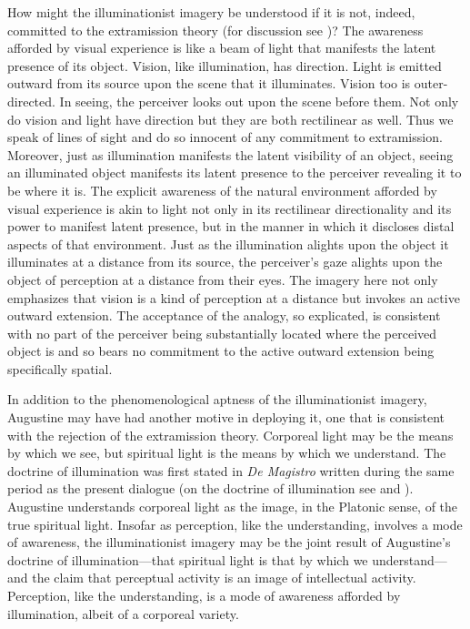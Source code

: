 \documentclass[12pt]{article}
\begin{document}
How might the illuminationist imagery be understood if it is not, indeed, committed to the extramission theory (for discussion see \citealt[chapter 5]{Kalderon:2018oe})? The awareness afforded by visual experience is like a beam of light that manifests the latent presence of its object. Vision, like illumination, has direction. Light is emitted outward from its source upon the scene that it illuminates. Vision too is outer-directed. In seeing, the perceiver looks out upon the scene before them. Not only do vision and light have direction but they are both rectilinear as well. Thus we speak of lines of sight and do so innocent of any commitment to extramission. Moreover, just as illumination manifests the latent visibility of an object, seeing an illuminated object manifests its latent presence to the perceiver revealing it to be where it is. The explicit awareness of the natural environment afforded by visual experience is akin to light not only in its rectilinear directionality and its power to manifest latent presence, but in the manner in which it discloses distal aspects of that environment. Just as the illumination alights upon the object it illuminates at a distance from its source, the perceiver’s gaze alights upon the object of perception at a distance from their eyes. The imagery here not only emphasizes that vision is a kind of perception at a distance but invokes an active outward extension. The acceptance of the analogy, so explicated, is consistent with no part of the perceiver being substantially located where the perceived object is and so bears no commitment to the active outward extension being specifically spatial. 


In addition to the phenomenological aptness of the illuminationist imagery, Augustine may have had another motive in deploying it, one that is consistent with the rejection of the extramission theory. Corporeal light may be the means by which we see, but spiritual light is the means by which we understand. The doctrine of illumination was first stated in \emph{De Magistro} written during the same period as the present dialogue (on the doctrine of illumination see \citealt{Allers:1952os} and \citealt{Matthews:2014aa}). Augustine understands corporeal light as the image, in the Platonic sense, of the true spiritual light. Insofar as perception, like the understanding, involves a mode of awareness, the illuminationist imagery may be the joint result of Augustine's doctrine of illumination---that spiritual light is that by which we understand---and the claim that perceptual activity is an image of intellectual activity. Perception, like the understanding, is a mode of awareness afforded by illumination, albeit of a corporeal variety.
\end{document}
